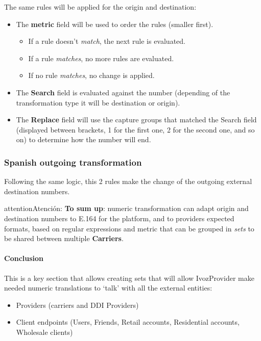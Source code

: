 \documentclass[letterpaper,10pt,spanish]{sphinxmanual}
\begin{document}
The same rules will be applied for the origin and destination:
\begin{itemize}
\item {} 
The \textbf{metric} field will be used to order the rules (smaller first).
\begin{itemize}
\item {} 
If a rule doesn't \emph{match}, the next rule is evaluated.

\item {} 
If a rule \emph{matches}, no more rules are evaluated.

\item {} 
If no rule \emph{matches}, no change is applied.

\end{itemize}

\item {} 
The \textbf{Search} field is evaluated against the number (depending of the
transformation type it will be destination or origin).

\item {} 
The \textbf{Replace} field will use the capture groups that matched the Search
field (displayed between brackets, 1 for the first one, 2 for the second
one, and so on) to determine how the number will end.

\end{itemize}


\subsubsection{Spanish outgoing transformation}
\label{administration_portal/brand/settings/numeric_transformations:spanish-outgoing-transformation}
Following the same logic, this 2 rules make the change of the outgoing external
destination numbers.

\begin{notice}{attention}{Atención:}
\textbf{To sum up}: numeric transformation can adapt origin and
destination numbers to E.164 for the platform, and to providers expected
formats, based on regular expressions and metric that can be grouped in \emph{sets}
to be shared between multiple \textbf{Carriers}.
\end{notice}


\paragraph{Conclusion}
\label{administration_portal/brand/settings/numeric_transformations:conclusion}
This is a key section that allows creating sets that will allow IvozProvider make needed numeric translations to `talk'
with all the external entities:
\begin{itemize}
\item {} 
Providers (carriers and DDI Providers)

\item {} 
Client endpoints (Users, Friends, Retail accounts, Residential accounts, Wholesale clients)

\end{itemize}
\end{document}
